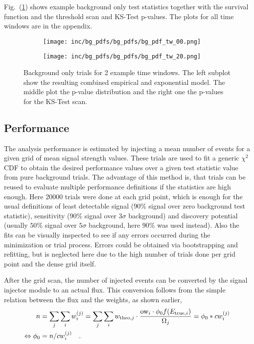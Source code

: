 Fig.~(\ref{fig:bg_ts_models}) shows example background only test statistics together with the survival function and the threshold scan and KS-Test p-values.
The plots for all time windows are in the appendix.

\begin{figure}[htbp]
  \centering
  \begin{subfigure}[c]{\textwidth}
    \texttt{[image: inc/bg\_pdfs/bg\_pdfs/bg\_pdf\_tw\_00.png]}
  \end{subfigure}
  \begin{subfigure}[c]{\textwidth}
    \texttt{[image: inc/bg\_pdfs/bg\_pdfs/bg\_pdf\_tw\_20.png]}
  \end{subfigure}
  \caption{Background only trials for 2 example time windows. The left subplot show the resulting combined empirical and exponential model. The middle plot the p-value distribution and the right one the p-values for the KS-Test scan.}
  \label{fig:bg_ts_models}
\end{figure}


\subsection{Performance}
The analysis performance is estimated by injecting a mean number of events for a given grid of mean signal strength values.
These trials are used to fit a generic $\chi^2$ CDF to obtain the desired performance values over a given test statistic value from pure background trials.
The advantage of this method is, that trials can be reused to evaluate multiple performance definitions if the statistics are high enough.
Here \num{20000} trials were done at each grid point, which is enough for the usual definitions of least detectable signal ($90\%$ signal over zero background test statistic), sensitivity ($90\%$ signal over $3\sigma$ background) and discovery potential (usually $50\%$ signal over $5\sigma$ background, here $90\%$ was used instead).
Also the fits can be visually inspected to see if any errors occurred during the minimization or trial process.
Errors could be obtained via bootstrapping and refitting, but is neglected here due to the high number of trials done per grid point and the dense grid itself.

After the grid scan, the number of injected events can be converted by the signal injector module to an actual flux.
This conversion follows from the simple relation between the flux and the weights, as shown earlier,
\begin{align}
  n &= \sum_j \sum_i w_i^{(j)}
    = \sum_j \sum_i w_{\mathrm{theo},j} \cdot
              \frac{\mathrm{ow}_i \cdot \phi_0 f(E_{\mathrm{true},i})}
                   {\Omega_j}
    = \phi_0 * c{w}_i^{(j)} \\
  \Leftrightarrow \phi_0 &= n / c{w}_i^{(j)} \quad\text{.}
\end{align}


